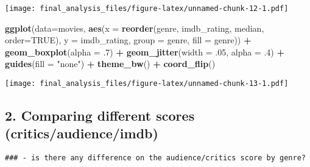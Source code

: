 \documentclass[]{article}
\newenvironment{Shaded}{\begin{snugshade}}{\end{snugshade}}
\newcommand{\KeywordTok}[1]{\textcolor[rgb]{0.13,0.29,0.53}{\textbf{#1}}}
\newcommand{\DataTypeTok}[1]{\textcolor[rgb]{0.13,0.29,0.53}{#1}}
\newcommand{\DecValTok}[1]{\textcolor[rgb]{0.00,0.00,0.81}{#1}}
\newcommand{\StringTok}[1]{\textcolor[rgb]{0.31,0.60,0.02}{#1}}
\newcommand{\OtherTok}[1]{\textcolor[rgb]{0.56,0.35,0.01}{#1}}
\newcommand{\OperatorTok}[1]{\textcolor[rgb]{0.81,0.36,0.00}{\textbf{#1}}}
\newcommand{\NormalTok}[1]{#1}
\begin{document}
\texttt{[image: final\_analysis\_files/figure-latex/unnamed-chunk-12-1.pdf]}

\begin{Shaded}
\begin{Highlighting}[]
\KeywordTok{ggplot}\NormalTok{(}\DataTypeTok{data=}\NormalTok{movies, }\KeywordTok{aes}\NormalTok{(}\DataTypeTok{x =} \KeywordTok{reorder}\NormalTok{(genre, imdb_rating, median, }\DataTypeTok{order=}\OtherTok{TRUE}\NormalTok{), }\DataTypeTok{y =}\NormalTok{ imdb_rating, }\DataTypeTok{group =}\NormalTok{ genre, }\DataTypeTok{fill =}\NormalTok{ genre)) }\OperatorTok{+}\StringTok{ }\KeywordTok{geom_boxplot}\NormalTok{(}\DataTypeTok{alpha =}\NormalTok{ .}\DecValTok{7}\NormalTok{) }\OperatorTok{+}\StringTok{ }\KeywordTok{geom_jitter}\NormalTok{(}\DataTypeTok{width =}\NormalTok{ .}\DecValTok{05}\NormalTok{, }\DataTypeTok{alpha =}\NormalTok{ .}\DecValTok{4}\NormalTok{) }\OperatorTok{+}\StringTok{ }\KeywordTok{guides}\NormalTok{(}\DataTypeTok{fill =} \StringTok{"none"}\NormalTok{) }\OperatorTok{+}\StringTok{ }\KeywordTok{theme_bw}\NormalTok{() }\OperatorTok{+}\StringTok{ }\KeywordTok{coord_flip}\NormalTok{()}
\end{Highlighting}
\end{Shaded}

\texttt{[image: final\_analysis\_files/figure-latex/unnamed-chunk-13-1.pdf]}

\subsection{2. Comparing different scores
(critics/audience/imdb)}\label{comparing-different-scores-criticsaudienceimdb-1}

\begin{verbatim}
### - is there any difference on the audience/critics score by genre?
\end{verbatim}
\end{document}
